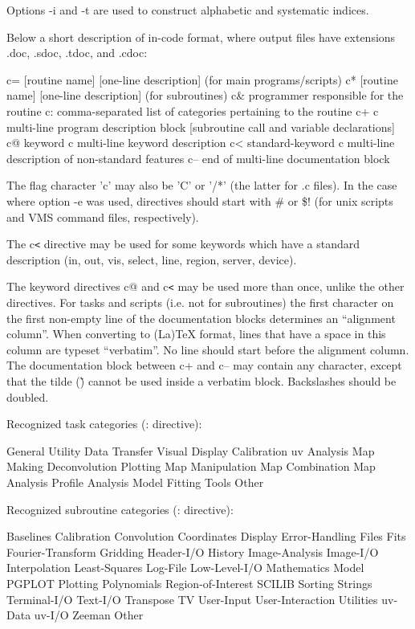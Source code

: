 {Options -i and -t are used to construct alphabetic and systematic
indices.

Below a short description of in-code format, where output files have
extensions .doc, .sdoc, .tdoc, and .cdoc:

{\eightpoint\begintt
 c=  [routine name] [one-line description] (for main programs/scripts)
 c*  [routine name] [one-line description] (for subroutines)
 c&  programmer responsible for the routine
 c:  comma-separated list of categories pertaining to the routine
 c+
 c   multi-line program description block
     [subroutine call and variable declarations]
 c@  keyword
 c   multi-line keyword description
 c<  standard-keyword
 c   multi-line description of non-standard features
 c-- end of multi-line documentation block

\endtt}
The flag character 'c' may also be 'C' or '/*' (the latter for .c
files). In the case where option -e was used, directives should start
with \# or \$! (for unix scripts and VMS command files, respectively).

The c{\tt <} directive may be used for some keywords which have a standard
description (in, out, vis, select, line, region, server, device).

The keyword directives c@ and c{\tt <} may be used more than once, unlike
the other directives. For tasks and scripts (i.e. not for subroutines)
the first character on the first non-empty line of the documentation
blocks determines an ``alignment column''. When converting to (La)TeX
format, lines that have a space in this column are typeset
``verbatim''. No line should start before the alignment column. The
documentation block between c+ and c-- may contain any character,
except that the tilde (\~) cannot be used inside a verbatim block.
Backslashes should be doubled.

Recognized task categories (: directive):
{\eightpoint\begintt
 General           Utility          Data Transfer   Visual Display
 Calibration       uv Analysis      Map Making      Deconvolution
 Plotting          Map Manipulation Map Combination Map Analysis
 Profile Analysis  Model Fitting    Tools           Other

\endtt}
Recognized subroutine categories (: directive):
{\eightpoint\begintt
 Baselines         Calibration      Convolution     Coordinates
 Display           Error-Handling   Files           Fits
 Fourier-Transform Gridding         Header-I/O      History
 Image-Analysis    Image-I/O        Interpolation   Least-Squares
 Log-File          Low-Level-I/O    Mathematics     Model
 PGPLOT            Plotting         Polynomials     Region-of-Interest
 SCILIB            Sorting          Strings         Terminal-I/O
 Text-I/O          Transpose        TV              User-Input
 User-Interaction  Utilities        uv-Data         uv-I/O
 Zeeman            Other

}}

